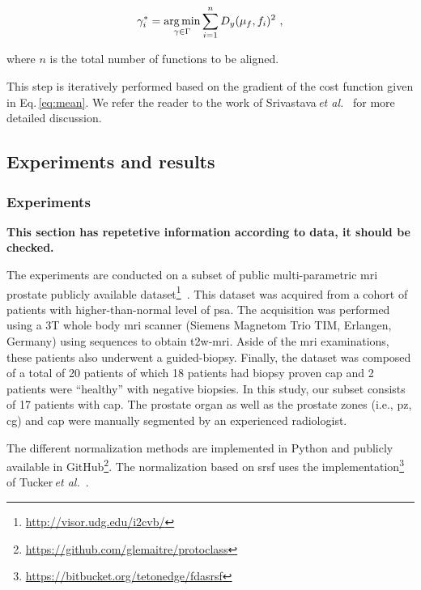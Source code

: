 \begin{equation}
  \gamma_{i}^{*} = \operatorname*{arg\,min}_{\gamma \in \Gamma} \sum_{i = 1}^{n} D_y(\mu_f, f_i)^2 \ ,
  \label{eq:warpi}
\end{equation}

\noindent where $n$ is the total number of functions to be aligned.

This step is iteratively performed based on the gradient of the cost function given in Eq.\,\eqref{eq:mean}. We refer the reader to the work of Srivastava\,\textit{et al.}~\cite{Srivastava2011} for more detailed discussion.




\subsection{Experiments and results}\label{subsec:chp5:T2-norm:Exp-res}

\subsubsection{Experiments}\label{subsub:chp5:T2-norm:res}
{\color{red}\textbf{This section has repetetive information according to data, it should be checked.}}

The experiments are conducted on a subset of public multi-parametric \ac{mri} prostate publicly available dataset\footnote{\url{http://visor.udg.edu/i2cvb/}}~\cite{lemaitre2015boosting}.
This dataset was acquired from a cohort of patients with higher-than-normal level of \ac{psa}. 
The acquisition was performed using a 3T whole body \ac{mri} scanner (Siemens Magnetom Trio TIM, Erlangen, Germany) using sequences to obtain \ac{t2w}-\ac{mri}. 
Aside of the \ac{mri} examinations, these patients also underwent a guided-biopsy. 
Finally, the dataset was composed of a total of 20 patients of which 18 patients had biopsy proven \ac{cap} and 2 patients were ``healthy'' with negative biopsies. 
In this study, our subset consists of 17 patients with \ac{cap}. 
The prostate organ as well as the prostate zones (i.e., \ac{pz}, \ac{cg}) and \ac{cap} were manually segmented by an experienced radiologist.

The different normalization methods are implemented in Python and publicly available in GitHub\footnote{\url{https://github.com/glemaitre/protoclass}}.
The normalization based on \ac{srsf} uses the implementation\footnote{\url{https://bitbucket.org/tetonedge/fdasrsf}} of Tucker\,\textit{et al.}~\cite{Tucker2013}.

